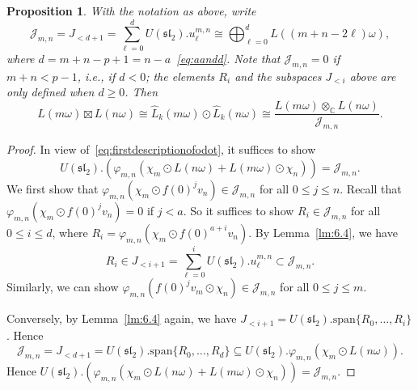 \documentclass[12pt,a4paper,reqno]{amsart}
\numberwithin{equation}{section}
\newtheorem{proposition}[theorem]{Proposition}
\theoremstyle{definition}
\renewcommand{\sl}{\mathfrak{sl}}
\newcommand{\C}{\mathbb{C}}
\def\spn{\mathrm{span}}
\def\om{\omega}
\def\o{\otimes}
\def\ds{\dots}
\begin{document}
\begin{proposition}\label{prop:fusiontensor}
With the notation as above,
write %
\[\mathcal{J}_{m,n}=J_{<d+1}=\sum_{\ell=0}^{d} U(\sl_2).u^{m,n}_\ell\cong\bigoplus_{\ell=0}^{d}L((m+n-2\ell)\om),\]
where $d=m+n-p+1=n-a$~\eqref{eq:aandd}.
Note that $\mathcal{J}_{m,n}=0$ if $m+n<p-1$, i.e., if $d<0$; the elements $R_i$ and the subspaces $J_{<i}$ above are only defined when $d\geq 0$. Then
	\begin{equation}\label{eq:tensor}
L(m\om )\boxtimes L(n\om)\cong \hat{L}_k(m\om)\odot \hat{L}_k(n\om)\cong \frac{L(m\om )\o_\C L(n\om)}{\mathcal{J}_{m,n}}.
\end{equation}
\end{proposition}
\begin{proof}
In view of~\eqref{eq:firstdescriptionofodot}, it suffices to show
\[U(\sl_2).\left(\varphi_{m,n}(\chi_m\odot L(n\om)+L(m\om)\odot \chi_n )\right)=\mathcal{J}_{m,n}.
\]
We first show that $\varphi_{m,n}(\chi_m\odot f(0)^jv_n)\in \mathcal{J}_{m,n}$ for all $0\leq j\leq n$. %
Recall that $\varphi_{m,n}(\chi_m\odot f(0)^jv_n)=0$ if $j<a$. So it suffices to show $R_i\in \mathcal{J}_{m,n}$ for all $0\leq i\leq d$, where $R_i=\varphi_{m,n}(\chi_m\odot f(0)^{a+i}v_n)$.
By Lemma~\ref{lm:6.4}, we have
\[
R_i\in J_{<i+1}=\sum_{\ell=0}^{i}U(\sl_2).u^{m,n}_{\ell}\subset \mathcal{J}_{m,n}.
\]
 Similarly, we can show $\varphi_{m,n}(f(0)^jv_m\odot \chi_n)\in \mathcal{J}_{m,n}$ for all $0\leq j\leq m$.

Conversely, by Lemma~\ref{lm:6.4} again, we have $J_{<i+1}=U(\sl_2).\spn\{R_0,\ds, R_i\}$. Hence \[\mathcal{J}_{m,n}=J_{<d+1}=U(\sl_2).\spn\{R_0,\ds, R_d\}\subseteq U(\sl_2).\varphi_{m,n}(\chi_m\odot L(n\om)).\]
Hence $U(\sl_2).\left(\varphi_{m,n}(\chi_m\odot L(n\om)+L(m\om)\odot \chi_n )\right)=\mathcal{J}_{m,n}.$
\end{proof}
\end{document}
